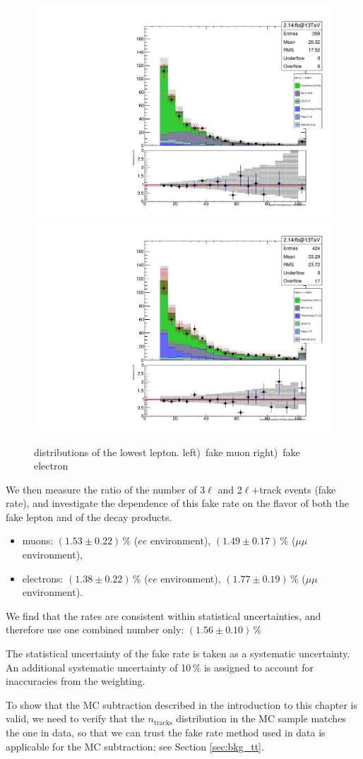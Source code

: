 \begin{figure}
\begin{center}
	\includegraphics[width=.5\textwidth]{Background/bkg_fakeLight/Z_muFake_MINMUONPT}%
	\includegraphics[width=.5\textwidth]{Background/bkg_fakeLight/Z_elFake_MINELECTRONPT}
	\caption{\pt distributions of the lowest \pt lepton. \enskip left)~fake muon \enskip right)~fake electron
	\label{fig:fakeLight_Z_MINleptonPT}}
\end{center}
\end{figure}

We then measure the ratio of the number of 3$\ell$ and 2$\ell$+track events (fake rate), and investigate the dependence of this fake rate on the flavor of both the fake lepton and of the \Z decay products.
\begin{itemize}
	\item muons: $(1.53 \pm 0.22)\,\%$ ($ee$ environment), $(1.49 \pm 0.17)\,\%$ ($\mu\mu$ environment),
	\item electrons: $(1.38 \pm 0.22)\,\%$ ($ee$ environment), $(1.77 \pm 0.19)\,\%$ ($\mu\mu$ environment).
\end{itemize}
We find that the rates are consistent within statistical uncertainties, and therefore use one combined number only: $(1.56 \pm 0.10)\,\%$

The statistical uncertainty of the fake rate is taken as a systematic uncertainty. An additional systematic uncertainty of 10\,\% is assigned to account for inaccuracies from the \pt weighting.

To show that the MC subtraction described in the introduction to this chapter is valid, we need to verify that the $n_\textrm{tracks}$ distribution in the \ttbar MC sample matches the one in data, so that we can trust the fake rate method used in data is applicable for the \ttbar MC subtraction; see Section \ref{sec:bkg_tt}.

